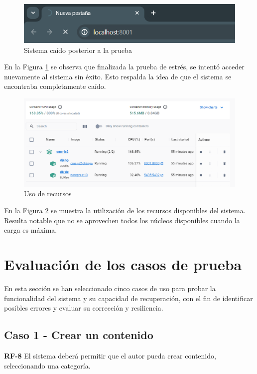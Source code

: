 \documentclass[10pt,times,twocolumn]{article}
\begin{document}
\begin{figure}[H]
	\centering
	\includegraphics[width=\linewidth]{fig/prueba_sistema_caido.png}
	\caption{Sistema caído posterior a la prueba}
	\label{fig:prueba_sistema_caido}
\end{figure}

En la Figura \ref{fig:prueba_sistema_caido} se observa que finalizada la prueba de estrés, se intentó acceder nuevamente al sistema sin éxito. Esto respalda la idea de que el sistema se encontraba completamente caído.

\begin{figure}[H]
	\centering
	\includegraphics[width=\linewidth]{fig/docker.png}
	\caption{Uso de recursos}
	\label{fig:prueba_recursos}
\end{figure}

En la Figura \ref{fig:prueba_recursos} se muestra la utilización de los recursos disponibles del sistema. Resulta notable que no se aprovechen todos los núcleos disponibles cuando la carga es máxima.

\section{Evaluación de los casos de prueba}

En esta sección se han seleccionado cinco casos de uso para probar la funcionalidad del sistema y su capacidad de recuperación, con el fin de identificar posibles errores y evaluar su corrección y resiliencia.

\subsection{Caso 1 - Crear un contenido}
\textbf{RF-8} El sistema deberá permitir que  el autor pueda crear contenido, seleccionando una categoría.
\end{document}
